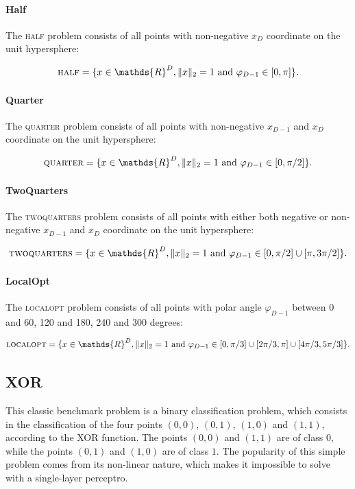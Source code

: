 \paragraph{Half}
The \textsc{half} problem consists of all points with non-negative $x_D$ coordinate on the unit hypersphere:

\[
    \textsc{half} = \{x \in \mathds{R}^D, \lVert x \rVert_2 = 1 \text{ and } \varphi_{D-1} \in [0, \pi]\}.
\]

\paragraph{Quarter}
The \textsc{quarter} problem consists of all points with non-negative $x_{D-1}$ and $x_D$ coordinate on the unit hypersphere:

\[
    \textsc{quarter} = \{x \in \mathds{R}^D, \lVert x \rVert_2 = 1 \text{ and } \varphi_{D-1} \in [0, \pi / 2]\}.
\]

\paragraph{TwoQuarters}
The \textsc{twoquarters} problem consists of all points with either both negative or non-negative $x_{D-1}$ and $x_D$ coordinate on the unit hypersphere:

\[
    \textsc{twoquarters} = \{x \in \mathds{R}^D, \lVert x \rVert_2 = 1 \text{ and } \varphi_{D-1} \in [0, \pi / 2] \cup [\pi, 3\pi / 2]\}.
\]

\paragraph{LocalOpt}
The \textsc{localopt} problem consists of all points with polar angle $\varphi_{D-1}$ between 0 and 60, 120 and 180, 240 and 300 degrees:

\[
    \textsc{localopt} = \{x \in \mathds{R}^D, \lVert x \rVert_2 = 1 \text{ and } \varphi_{D-1} \in [0, \pi / 3] \cup [2\pi / 3, \pi] \cup [4\pi / 3, 5\pi / 3]\}.
\]


\subsection{XOR}

This classic benchmark problem is a binary classification problem, which consists in the classification of the four points $(0, 0)$, $(0, 1)$, $(1, 0)$ and $(1, 1)$, according to the XOR function.
The points $(0, 0)$ and $(1, 1)$ are of class $0$, while the points $(0, 1)$ and $(1, 0)$ are of class $1$.
The popularity of this simple problem comes from its non-linear nature, which makes it impossible to solve with a single-layer perceptro.

